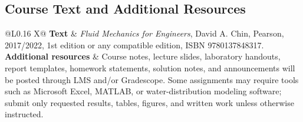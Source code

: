 \subsection*{Course Text and Additional Resources}
\begin{tabularx}{\textwidth}{@{}L{0.16\textwidth} X@{}}
\textbf{Text} & \textit{Fluid Mechanics for Engineers}, David A. Chin, Pearson, 2017/2022, 1st edition or any compatible edition, ISBN 9780137848317. \\
\textbf{Additional resources} & Course notes, lecture slides, laboratory handouts, report templates, homework statements, solution notes, and announcements will be posted through LMS and/or Gradescope. Some assignments may require tools such as Microsoft Excel, MATLAB, or water-distribution modeling software; submit only requested results, tables, figures, and written work unless otherwise instructed. \\
\end{tabularx}
